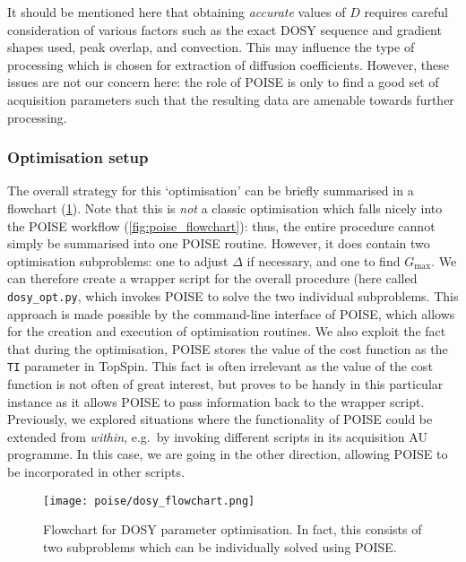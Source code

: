 It should be mentioned here that obtaining \textit{accurate} values of $D$ requires careful consideration of various factors such as the exact DOSY sequence and gradient shapes used\autocite{Sinnaeve2012CMR}, peak overlap\autocite{Antalek1996JACS,Windig1997CILS,Nilsson2006AC,Nilsson2008AC,Colbourne2011JACS}, and convection\autocite{Swan2015JMR,Barbosa2016RSCA}.
This may influence the type of processing which is chosen for extraction of diffusion coefficients.
However, these issues are not our concern here: the role of POISE is only to find a good set of acquisition parameters such that the resulting data are amenable towards further processing.


\subsubsection{Optimisation setup}

The overall strategy for this `optimisation' can be briefly summarised in a flowchart (\cref{fig:dosy_flowchart}).
Note that this is \textit{not} a classic optimisation which falls nicely into the POISE workflow (\cref{fig:poise_flowchart}): thus, the entire procedure cannot simply be summarised into one POISE routine.
However, it does contain two optimisation subproblems: one to adjust $\Delta$ if necessary, and one to find $G_\text{max}$.
We can therefore create a wrapper script for the overall procedure (here called \texttt{dosy\_opt.py}, which invokes POISE to solve the two individual subproblems.
This approach is made possible by the command-line interface of POISE, which allows for the creation and execution of optimisation routines.
We also exploit the fact that during the optimisation, POISE stores the value of the cost function as the \texttt{TI} parameter in TopSpin.
This fact is often irrelevant as the value of the cost function is not often of great interest, but proves to be handy in this particular instance as it allows POISE to pass information back to the wrapper script.
Previously, we explored situations where the functionality of POISE could be extended from \textit{within}, e.g.\ by invoking different scripts in its acquisition AU programme.
In this case, we are going in the other direction, allowing POISE to be incorporated in other scripts.

\begin{figure}[htb]
    \centering
    \texttt{[image: poise/dosy\_flowchart.png]}%
    \caption[Flowchart for DOSY parameter optimisation]{
        Flowchart for DOSY parameter optimisation. In fact, this consists of two subproblems which can be individually solved using POISE.
    }
    \label{fig:dosy_flowchart}
\end{figure}

